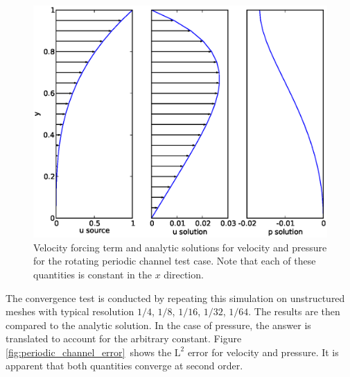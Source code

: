 \begin{figure}[htbp]
  \centering
  \onlypdf{\begin{pdfdisplay}}
    \includegraphics[width=1.1\textwidth]{examples_images/rotating_channel/analytic_solution.eps}
  \onlypdf{\end{pdfdisplay}}
  \caption{Velocity forcing term and analytic solutions for velocity and
    pressure for the rotating periodic channel test case. Note that each of
    these quantities is constant in the $x$ direction.}
  \label{fig:periodic_channel}
\end{figure}

The convergence test is conducted by repeating this simulation on unstructured meshes
with typical resolution $1/4$, $1/8$, $1/16$, $1/32$, $1/64$. The results
are then compared to the analytic solution. In the case of pressure, the
answer is translated to account for the arbitrary constant. Figure
\ref{fig:periodic_channel_error}\ shows the $\textrm{L}^2$ error for
velocity and pressure. It is apparent that both quantities converge at
second order.

